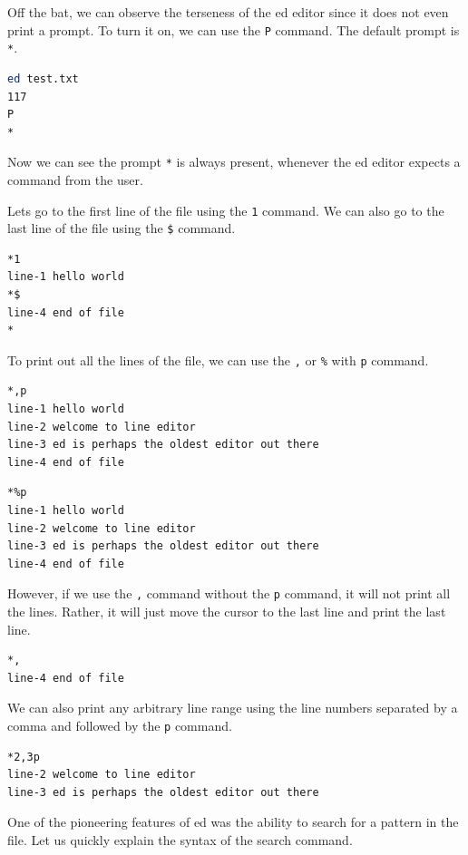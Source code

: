 Off the bat, we can observe the terseness of the ed editor
since it does not even print a prompt.
To turn it on, we can use the \lstinline|P| command.
The default prompt is \lstinline|*|.

\begin{lstlisting}[language=bash]
ed test.txt
117
P
*
\end{lstlisting}

Now we can see the prompt \lstinline|*| is always present,
whenever the ed editor expects a command from the user.

Lets go to the first line of the file using the \lstinline|1| command.
We can also go to the last line of the file using the \lstinline|$| command.

\begin{lstlisting}[language=bash]
*1
line-1 hello world
*$
line-4 end of file
*
\end{lstlisting}

To print out all the lines of the file,
we can use the \lstinline|,| or \lstinline|%| with \lstinline|p| command.

\begin{lstlisting}[language=bash]
*,p
line-1 hello world
line-2 welcome to line editor
line-3 ed is perhaps the oldest editor out there
line-4 end of file
\end{lstlisting}

\begin{lstlisting}[language=bash]
*%p
line-1 hello world
line-2 welcome to line editor
line-3 ed is perhaps the oldest editor out there
line-4 end of file
\end{lstlisting}

However, if we use the \lstinline|,| command without
the \lstinline|p| command, it will not print all the lines.
Rather, it will just move the cursor to the last line
and print the last line.

\begin{lstlisting}[language=bash]
*,
line-4 end of file
\end{lstlisting}

We can also print any arbitrary line range
using the line numbers separated by a comma
and followed by the \lstinline|p| command.

\begin{lstlisting}[language=bash]
*2,3p
line-2 welcome to line editor
line-3 ed is perhaps the oldest editor out there
\end{lstlisting}

One of the pioneering features of ed was the ability
to search for a pattern in the file. Let us quickly
explain the syntax of the search command.

